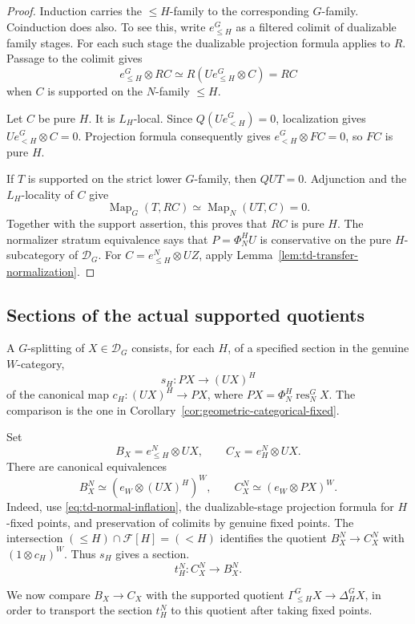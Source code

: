 \documentclass[11pt,reqno]{amsart}
\theoremstyle{definition}
\theoremstyle{remark}
\theoremstyle{plain}
\numberwithin{equation}{section}
\DeclareMathOperator{\Map}{Map}
\newcommand{\D}{\mathcal D}
\begin{document}
\begin{proof}
Induction carries the \(\le H\)-family to the corresponding
\(G\)-family. Coinduction does also. To see this, write
\(e_{\le H}^G\) as a filtered colimit of dualizable family stages.
For each such stage the dualizable projection formula applies to
\(R\). Passage to the colimit gives
\[
 e_{\le H}^G\otimes RC
 \simeq R(Ue_{\le H}^G\otimes C)=RC
\]
when \(C\) is supported on the \(N\)-family \(\le H\).

Let \(C\) be pure \(H\). It is \(L_H\)-local.
Since \(Q(Ue_{<H}^G)=0\), localization gives
\(Ue_{<H}^G\otimes C=0\). Projection formula consequently gives
\(e_{<H}^G\otimes FC=0\), so \(FC\) is pure \(H\).

If \(T\) is supported on the strict lower \(G\)-family, then
\(QUT=0\). Adjunction and the \(L_H\)-locality of \(C\) give
\[
 \Map_G(T,RC)\simeq\Map_N(UT,C)=0.
\]
Together with the support assertion, this proves that \(RC\)
is pure \(H\). The normalizer stratum equivalence says that
\(P=\Phi_N^HU\) is conservative on the pure \(H\)-subcategory
of \(\D_G\). For \(C=e_{\le H}^N\otimes UZ\), apply
Lemma~\ref{lem:td-transfer-normalization}.
\end{proof}

\subsection{Sections of the actual supported quotients}

A \(G\)-splitting of \(X\in\D_G\) consists, for each \(H\),
of a specified section in the genuine \(W\)-category,
\[
 s_H:PX\longrightarrow(UX)^H
\]
of the canonical map \(c_H:(UX)^H\to PX\), where
\(PX=\Phi_N^H\operatorname{res}_N^G X\).
The comparison is the one in
Corollary~\ref{cor:geometric-categorical-fixed}.

Set
\[
 B_X=e_{\le H}^N\otimes UX,\qquad
 C_X=e_H^N\otimes UX.
\]
There are canonical equivalences
\[
 B_X^N\simeq(e_W\otimes(UX)^H)^W,\qquad
 C_X^N\simeq(e_W\otimes PX)^W.
\]
Indeed, use \eqref{eq:td-normal-inflation}, the dualizable-stage
projection formula for \(H\)-fixed points, and preservation of
colimits by genuine fixed points. The intersection
\((\le H)\cap\mathcal F[H]=(<H)\) identifies the quotient
\(B_X^N\to C_X^N\) with \((1\otimes c_H)^W\).
Thus \(s_H\) gives a section.
\[
 t_H^N:C_X^N\longrightarrow B_X^N.
\]

We now compare \(B_X\to C_X\) with the supported quotient
\(\Gamma_{\le H}^G X\to\Delta_H^G X\), in order to transport
the section \(t_H^N\) to this quotient after taking fixed points.
\end{document}
